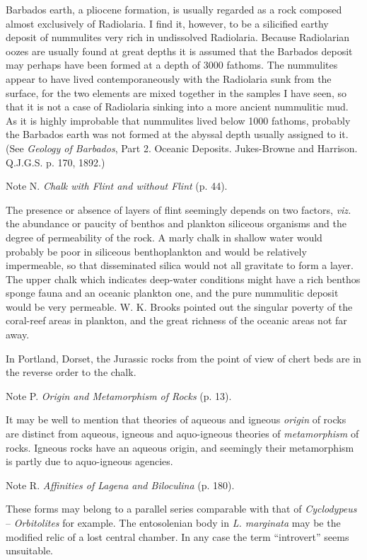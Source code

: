 \documentclass[a4paper, 12pt, oneside]{article}
\begin{document}
Barbados earth, a pliocene formation, is usually regarded as a rock composed almost exclusively of Radiolaria. I find it, however, to be a silicified earthy deposit of nummulites very rich in undissolved Radiolaria. Because Radiolarian oozes are usually found at great depths it is assumed that the Barbados deposit may perhaps have been formed at a depth of 3000 fathoms. The nummulites appear to have lived contemporaneously with the Radiolaria sunk from the surface, for the two elements are mixed together in the samples I have seen, so that it is not a case of Radiolaria sinking into a more ancient nummulitic mud. As it is highly improbable that nummulites lived below 1000 fathoms, probably the Barbados earth was not formed at the abyssal depth usually assigned to it. (See \emph{Geology of Barbados}, Part 2. Oceanic Deposits. Jukes-Browne and Harrison. Q.J.G.S. p. 170, 1892.)

Note N. \emph{Chalk with Flint and without Flint} (p. 44).

The presence or absence of layers of flint seemingly depends on two factors, \emph{viz.} the abundance or paucity of benthos and plankton siliceous organisms and the degree of permeability of the rock. A marly chalk in shallow water would probably be poor in siliceous benthoplankton and would be relatively impermeable, so that disseminated silica would not all gravitate to form a layer. The upper chalk which indicates deep-water conditions might have a rich benthos sponge fauna and an oceanic plankton one, and the pure nummulitic deposit would be very permeable. W. K. Brooks pointed out the singular poverty of the coral-reef areas in plankton, and the great richness of the oceanic areas not far away.

In Portland, Dorset, the Jurassic rocks from the point of view of chert beds are in the reverse order to the chalk.

Note P. \emph{Origin and Metamorphism of Rocks} (p. 13).

It may be well to mention that theories of aqueous and igneous \emph{origin} of rocks are distinct from aqueous, igneous and aquo-igneous theories of \emph{metamorphism} of rocks. Igneous rocks have an aqueous origin, and seemingly their metamorphism is partly due to aquo-igneous agencies.

Note R. \emph{Affinities of Lagena and Biloculina} (p. 180).

These forms may belong to a parallel series comparable with that of \emph{Cyclodypeus} -- \emph{Orbitolites} for example. The entosolenian body in \emph{L. marginata} may be the modified relic of a lost central chamber. In any case the term ``introvert'' seems unsuitable.
\clearpage
\end{document}
